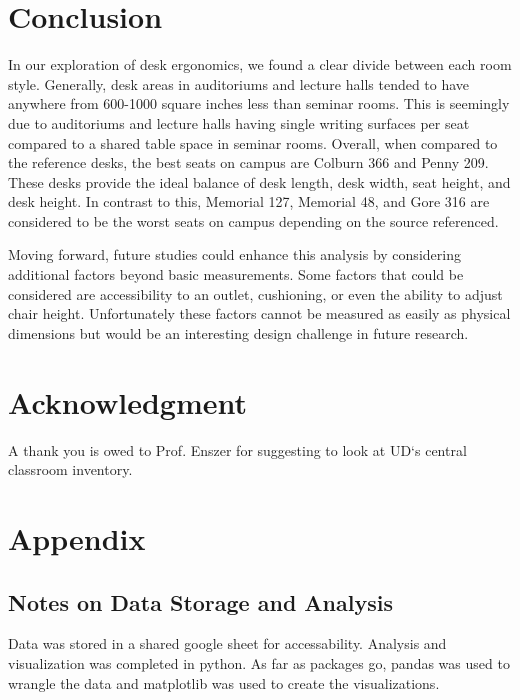 \documentclass[conference]{IEEEtran}
\begin{document}
\section{Conclusion}

In our exploration of desk ergonomics, we found a clear divide between each room style. Generally, desk areas in auditoriums and lecture halls tended to have anywhere from 600-1000 square inches less than seminar rooms. This is seemingly due to auditoriums and lecture halls having single writing surfaces per seat compared to a shared table space in seminar rooms.
Overall, when compared to the reference desks, the best seats on campus are Colburn 366 and Penny 209. These desks provide the ideal balance of desk length, desk width, seat height, and desk height. In contrast to this, Memorial 127, Memorial 48, and Gore 316 are considered to be the worst seats on campus depending on the source referenced.

Moving forward, future studies could enhance this analysis by considering additional factors beyond basic measurements. Some factors that could be considered are accessibility to an outlet, cushioning, or even the ability to adjust chair height. Unfortunately these factors cannot be measured as easily as physical dimensions but would be an interesting design challenge in future research.



\section*{Acknowledgment}

A thank you is owed to Prof. Enszer for suggesting to look at UD`s central classroom inventory.

   



\section*{Appendix}

\subsection{Notes on Data Storage and Analysis}

Data was stored in a shared google sheet for accessability. Analysis and visualization was completed in python. As far as packages go, pandas was used to wrangle the data and matplotlib was used to create the visualizations. 
\end{document}
